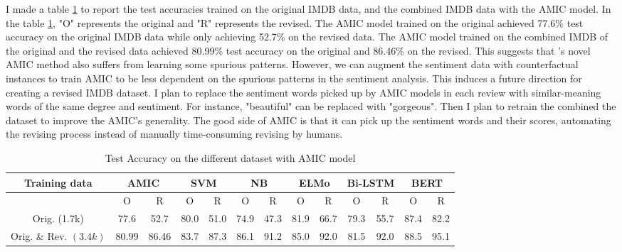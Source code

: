 \documentclass[aoas]{imsart}
\numberwithin{equation}{section}
\theoremstyle{plain}
\theoremstyle{remark}
\begin{document}
I made a table \ref{tab:comacc} to report the test accuracies trained on the original IMDB data, and the combined IMDB data with the AMIC model. In the table \ref{tab:comacc}, "O" represents the original and "R" represents the revised. The AMIC model trained on the original achieved 77.6\% test accuracy on the original IMDB data while only achieving 52.7\% on the revised data. The AMIC model trained on the combined IMDB of the original and the revised data achieved 80.99\% test accuracy on the original and 86.46\% on the revised. This suggests that \cite{chenyu}'s novel AMIC method also suffers from learning some spurious patterns. However, we can augment the sentiment data with counterfactual instances to train AMIC to be less dependent on the spurious patterns in the sentiment analysis. This induces a future direction for creating a revised IMDB dataset. I plan to replace the sentiment words picked up by AMIC models in each review with similar-meaning words of the same degree and sentiment. For instance, "beautiful" can be replaced with "gorgeous". Then I plan to retrain the combined the dataset to improve the AMIC's generality. The good side of AMIC is that it can pick up the sentiment words and their scores, automating the revising process instead of manually time-consuming revising by humans.

\begin{table}[ht]
    \centering
    \begin{tabular}{|c|c|c|c|c|c|c|c|c|c|c|c|c|}
    \hline Training data  & \multicolumn{2}{|c|}{AMIC} & \multicolumn{2}{|c|}{ SVM } & \multicolumn{2}{|c|}{ NB } & \multicolumn{2}{|c|}{ ELMo } & \multicolumn{2}{|c|}{ Bi-LSTM } & \multicolumn{2}{|c|}{ BERT } \\
    \hline & O & R & O & R & O & R & O & R & O & R & O & R \\
    \hline Orig. (1.7k) & 77.6 & 52.7 & 80.0 & 51.0 & 74.9 & 47.3 & 81.9 & 66.7 & 79.3 & 55.7 & 87.4 & 82.2 \\
    \hline Orig. \& Rev. $(3.4 k)$ & 80.99 & 86.46 & 83.7 & 87.3 & 86.1 & 91.2 & 85.0 & 92.0 & 81.5 & 92.0 & 88.5 & 95.1 \\
    \hline
    \end{tabular}
    \caption{Test Accuracy on the different dataset with AMIC model}
    \label{tab:comacc}
\end{table}
\end{document}
